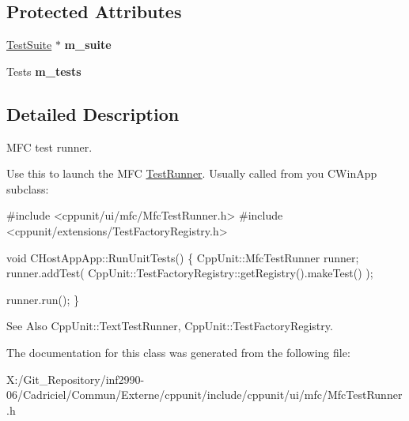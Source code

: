 \subsection*{Protected Attributes}
\begin{DoxyCompactItemize}
\item 
\hypertarget{class_mfc_test_runner_a7700f0b285e70f42f3e84b56be890658}{\hyperlink{class_test_suite}{Test\-Suite} $\ast$ {\bfseries m\-\_\-suite}}\label{class_mfc_test_runner_a7700f0b285e70f42f3e84b56be890658}

\item 
\hypertarget{class_mfc_test_runner_a041d453efb2f9e262676f1d68f1c22af}{Tests {\bfseries m\-\_\-tests}}\label{class_mfc_test_runner_a041d453efb2f9e262676f1d68f1c22af}

\end{DoxyCompactItemize}


\subsection{Detailed Description}
M\-F\-C test runner.

Use this to launch the M\-F\-C \hyperlink{class_test_runner}{Test\-Runner}. Usually called from you C\-Win\-App subclass\-: 


\begin{DoxyCode}
\textcolor{preprocessor}{#include <cppunit/ui/mfc/MfcTestRunner.h>}
\textcolor{preprocessor}{#include <cppunit/extensions/TestFactoryRegistry.h>}

\textcolor{keywordtype}{void} 
CHostAppApp::RunUnitTests()
\{
  CppUnit::MfcTestRunner runner;
  runner.addTest( CppUnit::TestFactoryRegistry::getRegistry().makeTest() );

  runner.run();    
\}
\end{DoxyCode}
 \begin{DoxySeeAlso}{See Also}
Cpp\-Unit\-::\-Text\-Test\-Runner, Cpp\-Unit\-::\-Test\-Factory\-Registry. 
\end{DoxySeeAlso}


The documentation for this class was generated from the following file\-:\begin{DoxyCompactItemize}
\item 
X\-:/\-Git\-\_\-\-Repository/inf2990-\/06/\-Cadriciel/\-Commun/\-Externe/cppunit/include/cppunit/ui/mfc/Mfc\-Test\-Runner.\-h\end{DoxyCompactItemize}
